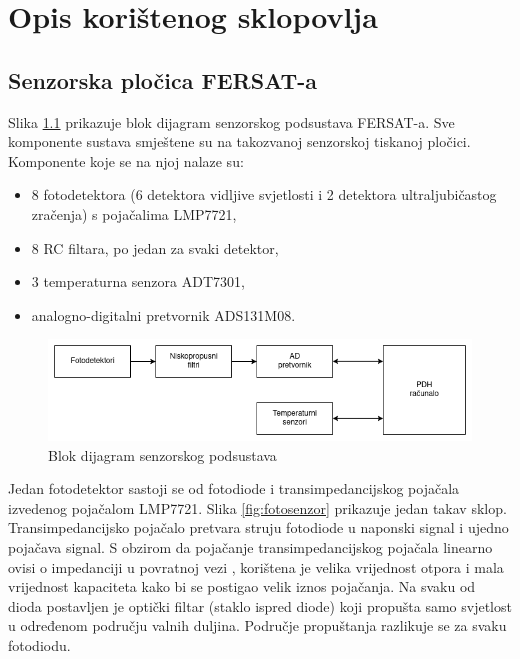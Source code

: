 \chapter{Opis korištenog sklopovlja}

\section{Senzorska pločica FERSAT-a}
Slika \ref{fig:sensor_board_blok} prikazuje blok dijagram senzorskog podsustava FERSAT-a. Sve komponente sustava smještene su na takozvanoj senzorskoj tiskanoj pločici. Komponente koje se na njoj nalaze su:
\begin{itemize}
    \item 8 fotodetektora (6 detektora vidljive svjetlosti i 2 detektora ultraljubičastog zračenja) s pojačalima LMP7721,
    \item 8 RC filtara, po jedan za svaki detektor,
    \item 3 temperaturna senzora ADT7301,
    \item analogno-digitalni pretvornik ADS131M08.
\end{itemize}

\begin{figure}[htb]
    \centering
    \includegraphics[width=\textwidth]{slike/sensor_board_blok.png}
    \caption{Blok dijagram senzorskog podsustava}
    \label{fig:sensor_board_blok}
\end{figure}

Jedan fotodetektor sastoji se od fotodiode i transimpedancijskog pojačala izvedenog pojačalom LMP7721. Slika \ref{fig:fotosenzor} prikazuje jedan takav sklop. Transimpedancijsko pojačalo pretvara struju fotodiode u naponski signal i ujedno pojačava signal. S obzirom da pojačanje transimpedancijskog pojačala linearno ovisi o impedanciji u povratnoj vezi \cite{lmp7721_datasheet}, korištena je velika vrijednost otpora i mala vrijednost kapaciteta kako bi se postigao velik iznos pojačanja. Na svaku od dioda postavljen je optički filtar (staklo ispred diode) koji propušta samo svjetlost u određenom području valnih duljina. Područje propuštanja razlikuje se za svaku fotodiodu.

